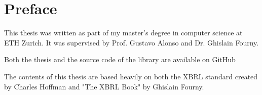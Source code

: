\chapter{Preface}

This thesis was written as part of my master's degree in computer science at ETH Zurich.
It was supervised by Prof. Gustavo Alonso and Dr. Ghislain Fourny.

Both the thesis and the source code of the library are available on GitHub\cite{brel_source}

The contents of this thesis are based heavily on both the XBRL standard\cite{xbrl} created by Charles Hoffman and "The XBRL Book"\cite{fourny2023xbrl} by Ghislain Fourny.